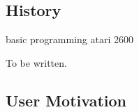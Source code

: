 \documentclass[a4paper,11.5pt]{report}
\numberwithin{figure}{section}
\numberwithin{table}{section}
\numberwithin{equation}{section}
\numberwithin{equation}{section}
\begin{document}





\subsection{History}

basic programming atari 2600

To be written.


\subsection{User Motivation}
\end{document}
